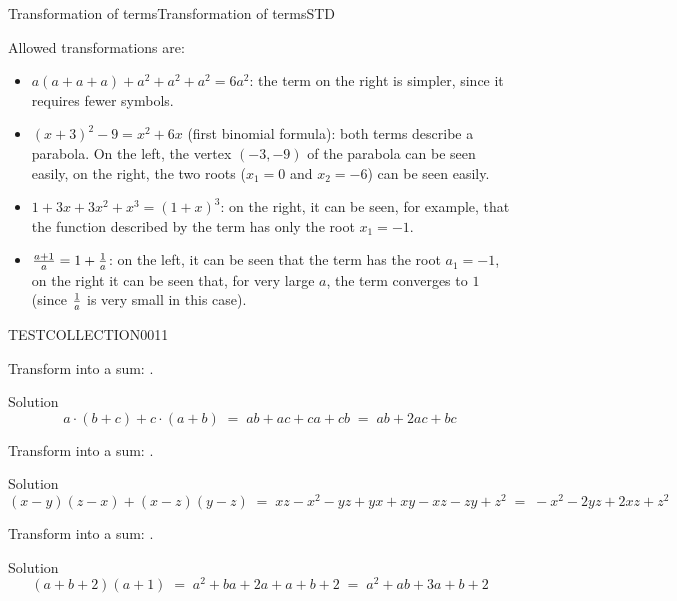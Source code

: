 \begin{MXContent}{Transformation of terms}{Transformation of terms}{STD}
\begin{MExample}
Allowed transformations are:
\begin{itemize}
\item{$a(a+a+a)+a^2+a^2+a^2 = 6a^2$: the term on the right is simpler, since it requires fewer symbols.}
\item{$(x+3)^2-9=x^2+6x$ (first binomial formula): both terms describe a parabola. On the left, 
the vertex $(-3,-9)$ of the parabola can be seen easily, on the right, the two roots ($x_1=0$ and $x_2=-6$)
can be seen easily.}
\item{$1+3x+3x^2+x^3=(1+x)^3$: on the right, it can be seen, for example, that the function described by the 
term has only the root $x_1=-1$.}
\item{$\tfrac{a+1}{a}=1+\tfrac{1}{a}$: on the left, it can be seen that the term has the root $a_1=-1$, 
on the right it can be seen that, for very large $a$, the term converges to $1$ (since $\tfrac{1}{a}$ is very 
small in this case).}
\end{itemize}
\end{MExample}


\begin{MExerciseCollection}{TESTCOLLECTION001}{1}

\begin{MExercise}
Transform into a sum: .
\begin{MHint}{Solution}
$$
a\cdot(b+c)+c\cdot(a+b) \;=\; a b + a c + c a + c b \;=\; a b + 2 a c + b c
$$
\end{MHint}
\end{MExercise}
\newpage

\begin{MExercise}
Transform into a sum: .
\begin{MHint}{Solution}
$$
(x-y)(z-x)+(x-z)(y-z) \;=\; x z - x^2 -y z +y x + x y - x z - z y + z^2 \;=\; -x^2 - 2 y z + 2 x z + z^2
$$
\end{MHint}
\end{MExercise}

\begin{MExercise}
Transform into a sum: .
\begin{MHint}{Solution}
$$
(a+b+2)(a+1) \;=\; a^2 + b a + 2a + a + b + 2 \;=\; a^2 + a b + 3a + b +2
$$
\end{MHint}
\end{MExercise}

\end{MExerciseCollection}




\end{MXContent}


